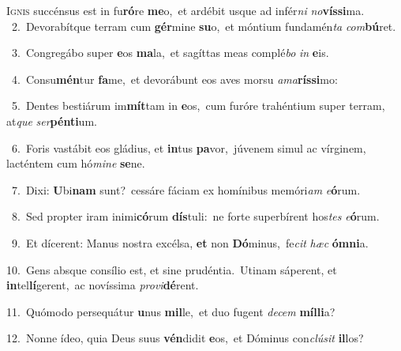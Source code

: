 \lettrine{\initial\textcolor{\initialcolor}{I}}{gnis} succénsus est in fu\-\textbf{ró}\-re \textbf{me}\-o,~\star et ardébit usque ad infér\textit{ni} \textit{no}\-\textbf{vís}\textbf{si}ma.\\
{\numbfont\textcolor{\numbcolor}{~2.}}~Devorabítque terram cum \textbf{gér}\-mine \textbf{su}\-o,~\star et móntium fundamén\textit{ta} \textit{com}\-\textbf{bú}ret.\par
{\numbfont\textcolor{\numbcolor}{~3.}}~Congregábo super \textbf{e}\-os \textbf{ma}\-la,~\star et sagíttas meas complé\textit{bo} \textit{in} \textbf{e}\-is.\par
{\numbfont\textcolor{\numbcolor}{~4.}}~Consu\-\textbf{mén}\-tur \textbf{fa}\-me,~\star et devorábunt eos aves morsu \textit{a}\-\textit{ma}\textbf{rís}\textbf{si}mo:\par
{\numbfont\textcolor{\numbcolor}{~5.}}~Dentes bestiárum im\-\textbf{mít}\-tam in \textbf{e}\-os,~\star cum furóre trahéntium super terram, at\textit{que} \textit{ser}\-\textbf{pén}\textbf{ti}um.\par
{\numbfont\textcolor{\numbcolor}{~6.}}~Foris vastábit eos gládius, et \textbf{in}\-tus \textbf{pa}\-vor,~\star júvenem simul ac vírginem, lacténtem cum hó\-\textit{mi}\-\textit{ne} \textbf{se}\-ne.\par
{\numbfont\textcolor{\numbcolor}{~7.}}~Dixi: \textbf{U}\-bi\textbf{nam} sunt?~\star cessáre fáciam ex homínibus memóri\textit{am} \textit{e}\-\textbf{ó}rum.\par
{\numbfont\textcolor{\numbcolor}{~8.}}~Sed propter iram inimi\-\textbf{có}\-rum \textbf{dís}\-tuli:~\star ne forte superbírent hos\textit{tes} \textit{e}\-\textbf{ó}rum.\par
{\numbfont\textcolor{\numbcolor}{~9.}}~Et dícerent: Manus nostra excélsa, \textbf{et} non \textbf{Dó}\-minus,~\star fe\textit{cit} \textit{hæc} \textbf{óm}\-\textbf{ni}a.\par
{\numbfont\textcolor{\numbcolor}{10.}}~Gens absque consílio est, et sine prudéntia.~\dagger Utinam sáperent, et \textbf{in}\-tel\-\textbf{lí}\-gerent,~\star ac novíssima \textit{pro}\-\textit{vi}\textbf{dé}rent.\par
{\numbfont\textcolor{\numbcolor}{11.}}~Quómodo persequátur \textbf{u}\-nus \textbf{mil}\-le,~\star et duo fugent \textit{de}\-\textit{cem} \textbf{míl}\-\textbf{li}a?\par
{\numbfont\textcolor{\numbcolor}{12.}}~Nonne ídeo, quia Deus suus \textbf{vén}\-didit \textbf{e}\-os,~\star et Dóminus con\-\textit{clú}\-\textit{sit} \textbf{il}\-los?\par
